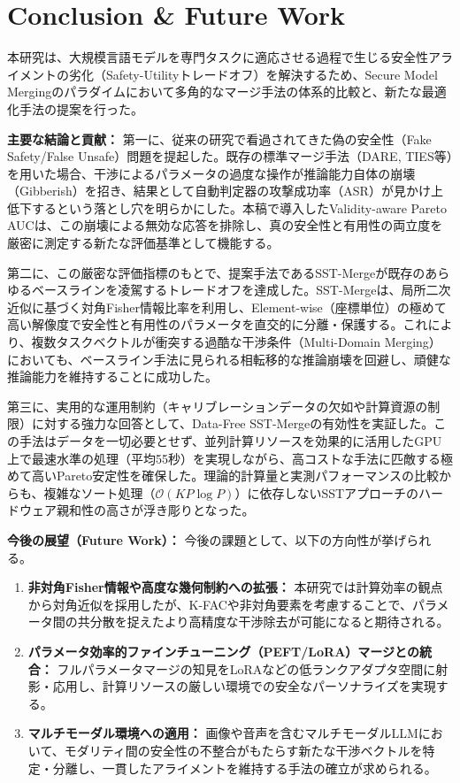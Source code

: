 \documentclass{article}
\begin{document}

\section{Conclusion \& Future Work}

本研究は、大規模言語モデルを専門タスクに適応させる過程で生じる安全性アライメントの劣化（Safety-Utilityトレードオフ）を解決するため、Secure Model Mergingのパラダイムにおいて多角的なマージ手法の体系的比較と、新たな最適化手法の提案を行った。

\textbf{主要な結論と貢献：}
第一に、従来の研究で看過されてきた偽の安全性（Fake Safety/False Unsafe）問題を提起した。既存の標準マージ手法（DARE, TIES等）を用いた場合、干渉によるパラメータの過度な操作が推論能力自体の崩壊（Gibberish）を招き、結果として自動判定器の攻撃成功率（ASR）が見かけ上低下するという落とし穴を明らかにした。本稿で導入したValidity-aware Pareto AUCは、この崩壊による無効な応答を排除し、真の安全性と有用性の両立度を厳密に測定する新たな評価基準として機能する。

第二に、この厳密な評価指標のもとで、提案手法であるSST-Mergeが既存のあらゆるベースラインを凌駕するトレードオフを達成した。SST-Mergeは、局所二次近似に基づく対角Fisher情報比率を利用し、Element-wise（座標単位）の極めて高い解像度で安全性と有用性のパラメータを直交的に分離・保護する。これにより、複数タスクベクトルが衝突する過酷な干渉条件（Multi-Domain Merging）においても、ベースライン手法に見られる相転移的な推論崩壊を回避し、頑健な推論能力を維持することに成功した。

第三に、実用的な運用制約（キャリブレーションデータの欠如や計算資源の制限）に対する強力な回答として、Data-Free SST-Mergeの有効性を実証した。この手法はデータを一切必要とせず、並列計算リソースを効果的に活用したGPU上で最速水準の処理（平均55秒）を実現しながら、高コストな手法に匹敵する極めて高いPareto安定性を確保した。理論的計算量と実測パフォーマンスの比較からも、複雑なソート処理（$\mathcal{O}(KP \log P)$）に依存しないSSTアプローチのハードウェア親和性の高さが浮き彫りとなった。

\textbf{今後の展望（Future Work）：}
今後の課題として、以下の方向性が挙げられる。
\begin{enumerate}
    \item \textbf{非対角Fisher情報や高度な幾何制約への拡張：} 本研究では計算効率の観点から対角近似を採用したが、K-FACや非対角要素を考慮することで、パラメータ間の共分散を捉えたより高精度な干渉除去が可能になると期待される。
    \item \textbf{パラメータ効率的ファインチューニング（PEFT/LoRA）マージとの統合：} フルパラメータマージの知見をLoRAなどの低ランクアダプタ空間に射影・応用し、計算リソースの厳しい環境での安全なパーソナライズを実現する。
    \item \textbf{マルチモーダル環境への適用：} 画像や音声を含むマルチモーダルLLMにおいて、モダリティ間の安全性の不整合がもたらす新たな干渉ベクトルを特定・分離し、一貫したアライメントを維持する手法の確立が求められる。
\end{enumerate}
\end{document}
